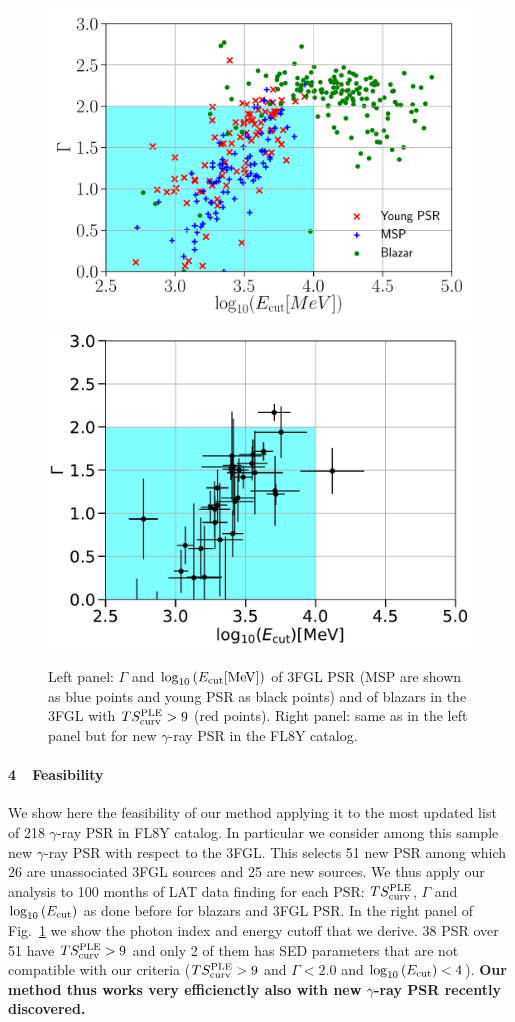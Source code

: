 \documentclass[12pt,twoside,letterpaper,onecolumn,english]{article}
\begin{document}
\begin{figure}[t]
	\centering
	\includegraphics[width=0.49\columnwidth]{CutoffIndex_3FGL_PSRYMFSRQ_compl_TS9.pdf}
        \includegraphics[width=0.49\columnwidth]{CutoffIndex_new_PSR_compl_giprop.pdf}
\vspace*{-5mm}
\caption{{\captionf Left panel: $\Gamma$ and $\log_{10}{(E_{\rm{cut}}[\rm{MeV}])}$ of 3FGL PSR (MSP are shown
  as blue points and young PSR as black points) and of blazars in the
  3FGL with $TS^{\rm{PLE}}_{\rm{curv}}>9$ (red points).  Right panel: same as in the left panel
  but for new $\gamma$-ray PSR in the FL8Y catalog.}}
\label{fig:indexcutpsrblaz} 
\end{figure}





\paragraph{4\ \ Feasibility}
We show here the feasibility of our method applying it to the most updated list of 218 $\gamma$-ray PSR in FL8Y catalog.
In particular we consider among this sample new $\gamma$-ray PSR with respect to the 3FGL.
This selects 51 new PSR among which 26 are unassociated 3FGL sources and 25 are new sources.
We thus apply our analysis to 100 months of LAT data finding for each PSR: $TS^{\rm{PLE}}_{\rm{curv}}$, $\Gamma$ and $\log_{10}{(E_{\rm{cut}})}$ as done before for blazars and 3FGL PSR.
In the right panel of Fig.~\ref{fig:indexcutpsrblaz} we show the photon index and energy cutoff that we derive. 38 PSR over 51 have $TS^{\rm{PLE}}_{\rm{curv}}>9$ and only 2 of them has SED parameters that are not compatible with our criteria ($TS^{\rm{PLE}}_{\rm{curv}}>9$ and $\Gamma<2.0$ and $\log_{10}{(E_{\rm{cut}})}<4$).
{\bf Our method thus works very efficienctly also with new $\gamma$-ray PSR recently discovered.}
\end{document}

